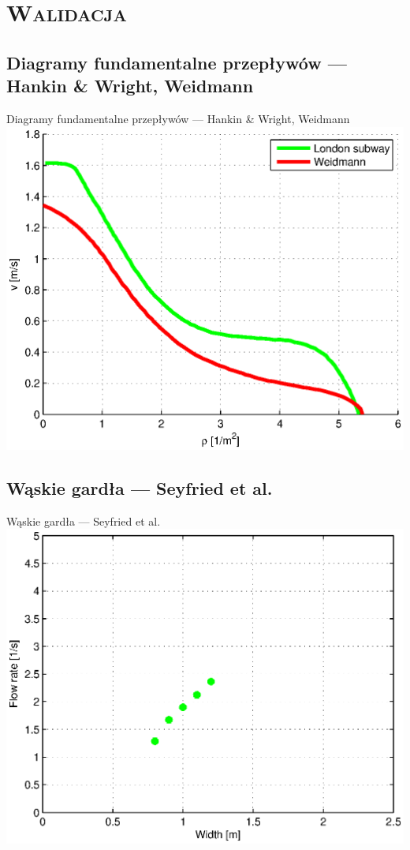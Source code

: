 \section{\scshape Walidacja}

\subsection{Diagramy fundamentalne przepływów --- Hankin \&{} Wright, Weidmann}
\begin{frame}{Diagramy fundamentalne przepływów --- Hankin \&{} Wright, Weidmann}
  \includegraphics[width=\textwidth,height=0.8\textheight,keepaspectratio]{wykresy-hankin-wright}
\end{frame}

\subsection{Wąskie gardła --- Seyfried et al.}
\begin{frame}{Wąskie gardła --- Seyfried et al.}
  \includegraphics[width=\textwidth,height=0.8\textheight,keepaspectratio]{wykresy-seyfried}
\end{frame}


